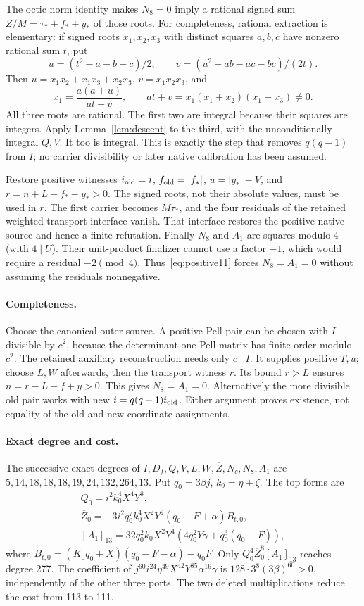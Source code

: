 The octic norm identity makes $N_8=0$ imply a rational signed sum
$\overline Z/M=\tau_*+f_*+y_*$ of those roots. For completeness, rational
extraction is elementary: if signed roots $x_1,x_2,x_3$ with distinct
squares $a,b,c$ have nonzero rational sum $t$, put
\[
 u=(t^2-a-b-c)/2,\qquad v=(u^2-ab-ac-bc)/(2t).
\]
Then $u=x_1x_2+x_1x_3+x_2x_3$, $v=x_1x_2x_3$, and
\[
 x_1=\frac{a(a+u)}{at+v},\qquad
 at+v=x_1(x_1+x_2)(x_1+x_3)\ne0.
\]
All three roots are rational. The first two are integral because their
squares are integers. Apply Lemma~\ref{lem:descent} to the third, with the
unconditionally integral $Q,V$. It too is integral. This is exactly the
step that removes $q(q-1)$ from $I$; no carrier divisibility or later
native calibration has been assumed.

Restore positive witnesses $i_{\rm old}=i$, $f_{\rm old}=|f_*|$,
$u=|y_*|-V$, and $r=n+L-f_*-y_*>0$.
The signed roots, not their absolute values, must be used in $r$.
The first carrier becomes $M\tau_*$, and the four residuals of the
retained weighted transport interface vanish. That interface restores
the positive native source and hence a finite refutation.
Finally $N_8$ and $A_1$ are squares modulo 4 (with $4\mid U$).
Their unit-product finalizer cannot use a factor $-1$, which would require
a residual $-2\pmod4$. Thus~\eqref{eq:positive11} forces
$N_8=A_1=0$ without assuming the residuals nonnegative.

\paragraph{Completeness.}
Choose the canonical outer source. A positive Pell pair can be chosen
with $I$ divisible by $c^2$, because the determinant-one Pell matrix has
finite order modulo $c^2$. The retained auxiliary reconstruction needs
only $c\mid I$. It supplies positive $T,u$; choose $L,W$ afterwards,
then the transport witness $r$. Its bound $r>L$ ensures
$n=r-L+f+y>0$. This gives $N_8=A_1=0$. Alternatively the more divisible
old pair works with new $i=q(q-1)i_{\rm old}$. Either argument proves
existence, not equality of the old and new coordinate assignments.

\paragraph{Exact degree and cost.}
The successive exact degrees of $I,D_f,Q,V,L,W,\overline Z,N_c,N_8,A_1$
are $5,14,18,18,18,19,24,132,264,13$.
Put $q_0=3\beta j$, $k_0=\eta+\zeta$. The top forms are
\begin{gather*}
 Q_0=i^2k_0^4X^4Y^8,\\
 \overline Z_0=-3i^2q_0^7k_0^4X^2Y^6(q_0+F+\alpha)B_{t,0},\\
 [A_1]_{13}=32q_0^2k_0X^2Y^4
                 (4q_0^2Y\gamma+q_0^3(q_0-F)),
\end{gather*}
where $B_{t,0}=(K_0q_0+X)(q_0-F-\alpha)-q_0F$.
Only $Q_0^4\overline Z_0^8[A_1]_{13}$ reaches degree 277.
The coefficient of
$j^{60}i^{24}\eta^{49}X^{42}Y^{85}\alpha^{16}\gamma$
is $128\cdot3^8(3\beta)^{60}>0$, independently of the other three ports.
The two deleted multiplications reduce the cost from 113 to 111.

